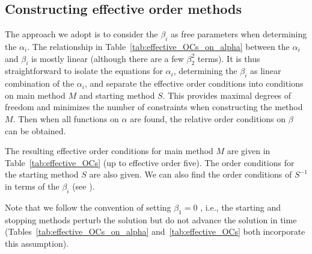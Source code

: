 \subsection{Constructing effective order methods}
The approach we adopt is to consider the $\beta_{i}$ as free
parameters when determining the $\alpha_i$.
The relationship in Table~\ref{tab:effective_OCs_on_alpha} between the
$\alpha_i$ and $\beta_i$ is mostly linear (although there are a few
$\beta_2^2$ terms).
It is thus straightforward to isolate the equations for $\alpha_i$,
determining the $\beta_i$ as linear combination of the $\alpha_i$, and
separate the effective order conditions into conditions on main method
$M$ and starting method $S$.
This provides maximal degrees of freedom and minimizes the number of
constraints when constructing the method $M$.
Then when all functions on $\alpha$ are found, the relative order
conditions on $\beta$ can be obtained.

The resulting effective order conditions for main method $M$ are given
in Table~\ref{tab:effective_OCs} (up to effective order five).
The order conditions for the starting method $S$ are also given.
We can also find the order conditions of
$S^{-1}$
in terms of the
$\beta_i$ (see \cite[Table~386(III)]{Butcher2008_book}).

Note that we follow the convention of setting $\beta_1=0$
\cite{Butcher2008_book}, i.e., the starting and stopping methods
perturb the solution but do not advance the solution in time
(Tables~\ref{tab:effective_OCs_on_alpha} and~\ref{tab:effective_OCs} both incorporate
this assumption).

